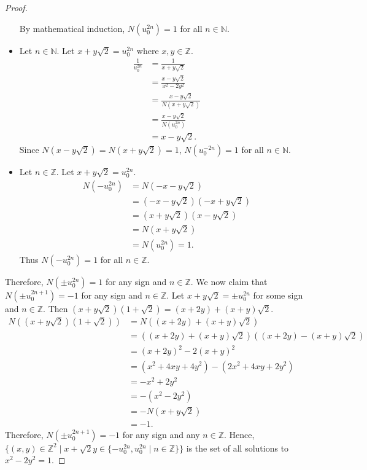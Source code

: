 \documentclass[12pt, psamsfonts]{amsart}
\theoremstyle{definition}
\theoremstyle{remark}
\numberwithin{equation}{section}
\begin{document}
\begin{proof}
\begin{itemize}
      By mathematical induction, $N(u_0^{2n}) = 1$ for all $n \in \mathbb{N}$.
    \item
      Let $n \in \mathbb{N}$.
      Let $x + y\sqrt{2} = u_0^{2n}$ where $x, y \in \mathbb{Z}$.
      \begin{align*}
        \frac{1}{u_0^{2n}}
          &= \frac{1}{x + y\sqrt{2}} \\
          &= \frac{x - y\sqrt{2}}{x^2 - 2y^2} \\
          &= \frac{x - y\sqrt{2}}{N(x + y\sqrt{2})} \\
          &= \frac{x - y\sqrt{2}}{N(u_0^{2n})} \\
          &= x - y\sqrt{2}.
      \end{align*}
      Since $N(x - y\sqrt{2}) = N(x + y\sqrt{2}) = 1$, $N(u_0^{-2n}) = 1$ for all $n \in \mathbb{N}$.
    \item
      Let $n \in \mathbb{Z}$.
      Let $x + y\sqrt{2} = u_0^{2n}$.
      \begin{align*}
        N(-u_0^{2n})
          &= N(-x - y\sqrt{2}) \\
          &= (-x - y\sqrt{2})(-x + y\sqrt{2}) \\
          &= (x + y\sqrt{2})(x - y\sqrt{2}) \\
          &= N(x + y\sqrt{2}) \\
          &= N(u_0^{2n}) = 1.
      \end{align*}
      Thus $N(-u_0^{2n}) = 1$ for all $n \in \mathbb{Z}$.
  \end{itemize}
  Therefore, $N(\pm u_0^{2n}) = 1$ for any sign and $n \in \mathbb{Z}$.
  We now claim that $N(\pm u_0^{2n + 1}) = -1$ for any sign and $n \in \mathbb{Z}$.
  Let $x + y\sqrt{2} = \pm u_0^{2n}$ for some sign and $n \in \mathbb{Z}$.
  Then $(x + y\sqrt{2})(1 + \sqrt{2}) = (x + 2y) + (x + y)\sqrt{2}$.
  \begin{align*}
    N((x + y\sqrt{2})(1 + \sqrt{2}))
      &= N((x + 2y) + (x + y)\sqrt{2}) \\
      &= ((x + 2y) + (x + y)\sqrt{2})((x + 2y) - (x + y)\sqrt{2}) \\
      &= (x + 2y)^2 - 2(x + y)^2 \\
      &= (x^2 + 4xy + 4y^2) - (2x^2 + 4xy + 2y^2) \\
      &= -x^2 + 2y^2 \\
      &= -(x^2 - 2y^2) \\
      &= -N(x + y\sqrt{2}) \\
      &= -1.
  \end{align*}
  Therefore, $N(\pm u_0^{2n + 1}) = -1$ for any sign and any $n \in \mathbb{Z}$.
  Hence, $\{ (x, y) \in \mathbb{Z}^2 \mid x + \sqrt{2}y \in \{ -u_0^{2n}, u_0^{2n} \mid n \in \mathbb{Z} \} \}$ is the set of all solutions to $x^2 - 2y^2 = 1$.
\end{proof}
\end{document}
